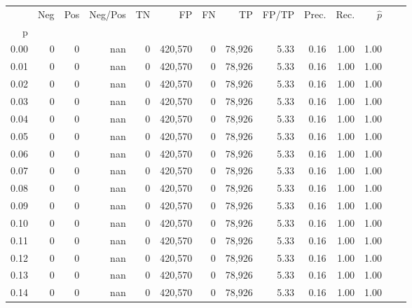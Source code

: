 \begin{tabular}{rrrrrrrrrrrrrr}
\toprule
{} &     Neg &     Pos & Neg/Pos &       TN &       FP &      FN &      TP & FP/TP & Prec. &  Rec. & $\hat{p}$ \\
p    &         &         &         &          &          &         &         &       &       &       &           \\
\midrule
0.00 &       0 &       0 &     nan &        0 &  420,570 &       0 &  78,926 &  5.33 &  0.16 &  1.00 &      1.00 \\
0.01 &       0 &       0 &     nan &        0 &  420,570 &       0 &  78,926 &  5.33 &  0.16 &  1.00 &      1.00 \\
0.02 &       0 &       0 &     nan &        0 &  420,570 &       0 &  78,926 &  5.33 &  0.16 &  1.00 &      1.00 \\
0.03 &       0 &       0 &     nan &        0 &  420,570 &       0 &  78,926 &  5.33 &  0.16 &  1.00 &      1.00 \\
0.04 &       0 &       0 &     nan &        0 &  420,570 &       0 &  78,926 &  5.33 &  0.16 &  1.00 &      1.00 \\
0.05 &       0 &       0 &     nan &        0 &  420,570 &       0 &  78,926 &  5.33 &  0.16 &  1.00 &      1.00 \\
0.06 &       0 &       0 &     nan &        0 &  420,570 &       0 &  78,926 &  5.33 &  0.16 &  1.00 &      1.00 \\
0.07 &       0 &       0 &     nan &        0 &  420,570 &       0 &  78,926 &  5.33 &  0.16 &  1.00 &      1.00 \\
0.08 &       0 &       0 &     nan &        0 &  420,570 &       0 &  78,926 &  5.33 &  0.16 &  1.00 &      1.00 \\
0.09 &       0 &       0 &     nan &        0 &  420,570 &       0 &  78,926 &  5.33 &  0.16 &  1.00 &      1.00 \\
0.10 &       0 &       0 &     nan &        0 &  420,570 &       0 &  78,926 &  5.33 &  0.16 &  1.00 &      1.00 \\
0.11 &       0 &       0 &     nan &        0 &  420,570 &       0 &  78,926 &  5.33 &  0.16 &  1.00 &      1.00 \\
0.12 &       0 &       0 &     nan &        0 &  420,570 &       0 &  78,926 &  5.33 &  0.16 &  1.00 &      1.00 \\
0.13 &       0 &       0 &     nan &        0 &  420,570 &       0 &  78,926 &  5.33 &  0.16 &  1.00 &      1.00 \\
0.14 &       0 &       0 &     nan &        0 &  420,570 &       0 &  78,926 &  5.33 &  0.16 &  1.00 &      1.00 \\

\end{tabular}
